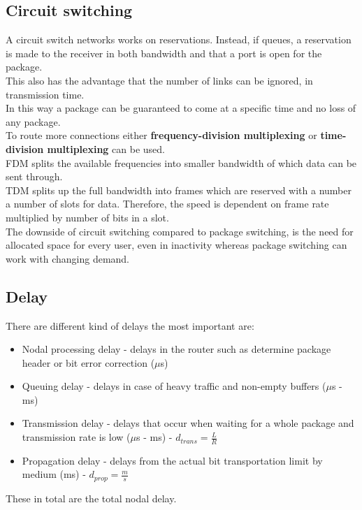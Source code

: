 \documentclass[12pt, a4paper]{article}
\begin{document}
		\subsection{Circuit switching}
			A circuit switch networks works on reservations. Instead, if queues, a reservation is made to the receiver in both bandwidth and that a port is open for the package.\\
			This also has the advantage that the number of links can be ignored, in transmission time.\\
			In this way a package can be guaranteed to come at a specific time and no loss of any package.\\
			To route more connections either \textbf{frequency-division multiplexing} or \textbf{time-division multiplexing} can be used.\\
			FDM splits the available frequencies into smaller bandwidth of which data can be sent through.\\
			TDM splits up the full bandwidth into frames which are reserved with a number a number of slots for data. Therefore, the speed is dependent on frame rate multiplied by number of bits in a slot.\\
			The downside of circuit switching compared to package switching, is the need for allocated space for every user, even in inactivity whereas package switching can work with changing demand.
		\subsection{Delay}
			There are different kind of delays the most important are:
			\begin{itemize}
				\item Nodal processing delay - delays in the router such as determine package header or bit error correction ($\mu$s)
				\item Queuing delay - delays in case of heavy traffic and non-empty buffers ($\mu$s - ms)
				\item Transmission delay - delays that occur when waiting for a whole package and transmission rate is low  ($\mu$s - ms) - $d_{trans}=\frac{L}{R}$
				\item Propagation delay - delays from the actual bit transportation limit by medium (ms) - $d_{prop}=\frac{m}{s}$
			\end{itemize}
			These in total are the total nodal delay.\\
			
\end{document}
